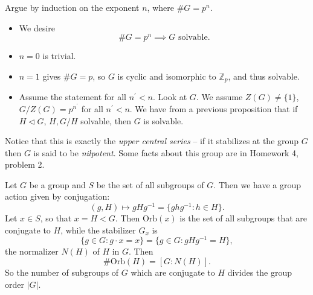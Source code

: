 Argue by induction on the exponent $n$, where $\# G = p^n$.
\begin{itemize}
  \item{ We desire
  $$
  \# G = p^n \implies G \text{ solvable}.
  $$
  }
  \item{$n=0$ is trivial.}
  \item{$n=1$ gives $\# G = p$, so $G$ is cyclic and isomorphic to
        $\mathbb{Z}_p$, and thus solvable.}
  \item{Assume the statement for all $n^\prime < n$. Look at
        $G$. We assume $Z(G) \neq \{ 1 \}$, $G / Z(G) = p^{n^\prime}$ for
        all $n^\prime < n$. We have from a previous proposition that
        if $H \triangleleft G$, $H, G/H$ solvable, then $G$ is
        solvable.
        }
\end{itemize}
Notice that this is exactly the \emph{upper central series} -- if it
stabilizes at the group $G$ then $G$ is said to be
\emph{nilpotent}. Some facts about this group are in Homework 4,
problem 2.


\begin{xmpl}
Let $G$ be a group and $S$ be the set of all subgroups of $G$. Then
we have a group action given by conjugation:
$$
(g, H) \mapsto gHg^{-1} = \{ g h g^{-1} : h \in H \}.
$$
Let $x \in S$, so that $x = H < G$. Then $\mathrm{Orb}(x)$ is the set of
all subgroups that are conjugate to $H$, while the stabilizer $G_x$ is
$$
\{ g \in G : g \cdot x = x \} = \{ g \in G : g H g^{-1} = H \},
$$
the normalizer $N(H)$ of $H$ in $G$. Then
$$
\# \mathrm{Orb}(H) = [G : N(H)].
$$
So the number of subgroups of $G$ which are conjugate to $H$ divides
the group order $|G|$.
\end{xmpl}

